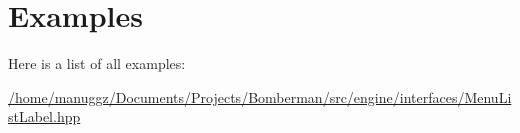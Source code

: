 \section{Examples}
Here is a list of all examples\+:\begin{DoxyCompactItemize}
\item 
\hyperlink{_2home_2manuggz_2_documents_2_projects_2_bomberman_2src_2engine_2interfaces_2_menu_list_label_8hpp-example}{/home/manuggz/\+Documents/\+Projects/\+Bomberman/src/engine/interfaces/\+Menu\+List\+Label.\+hpp}
\end{DoxyCompactItemize}
